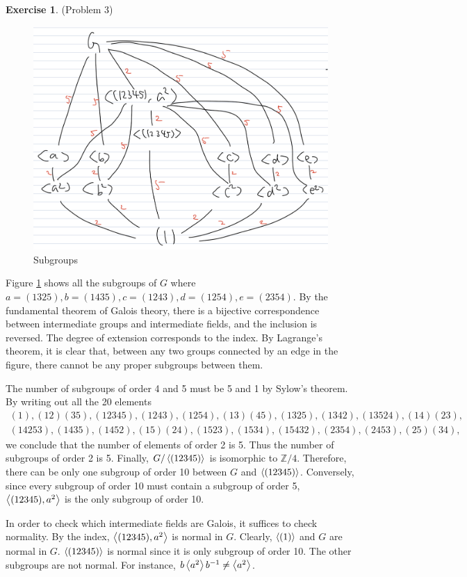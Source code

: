 \documentclass[12pt, psamsfonts]{amsart}
\theoremstyle{definition}
\newtheorem*{exer}{Exercise}
\theoremstyle{remark}
\numberwithin{equation}{section}
\begin{document}
\begin{exer}{(Problem 3)}
  \begin{figure}
    \includegraphics[width=.7\linewidth]{subgroups.jpeg}
    \caption{Subgroups}
    \label{fig:subgroups}
  \end{figure}
  Figure \ref{fig:subgroups} shows all the subgroups of $G$ where $a = (1325), b = (1435), c = (1243), d = (1254), e = (2354)$.
  By the fundamental theorem of Galois theory, there is a bijective correspondence between intermediate groups and intermediate fields, and the inclusion is reversed.
  The degree of extension corresponds to the index.
  By Lagrange's theorem, it is clear that, between any two groups connected by an edge in the figure, there cannot be any proper subgroups between them.

  The number of subgroups of order 4 and 5 must be 5 and 1 by Sylow's theorem.
  By writing out all the 20 elements
  \begin{align*}
    (1),(12)(35),(12345),(1243),(1254),(13)(45),(1325),(1342),(13524),(14)(23), \\
    (14253),(1435),(1452),(15)(24),(1523),(1534),(15432),(2354),(2453),(25)(34),
  \end{align*}
  we conclude that the number of elements of order 2 is 5.
  Thus the number of subgroups of order 2 is 5.
  Finally, $G / \ev{(12345)}$ is isomorphic to $\mathbb{Z}/4$.
  Therefore, there can be only one subgroup of order 10 between $G$ and $\ev{(12345)}$.
  Conversely, since every subgroup of order 10 must contain a subgroup of order 5, $\ev{(12345), a^2}$ is the only subgroup of order 10.

  In order to check which intermediate fields are Galois, it suffices to check normality.
  By the index, $\ev{(12345), a^2}$ is normal in $G$.
  Clearly, $\ev{(1)}$ and $G$ are normal in $G$.
  $\ev{(12345)}$ is normal since it is only subgroup of order 10.
  The other subgroups are not normal.
  For instance, $b\ev{a^2}b^{-1} \ne \ev{a^2}$.
\end{exer}
\end{document}
